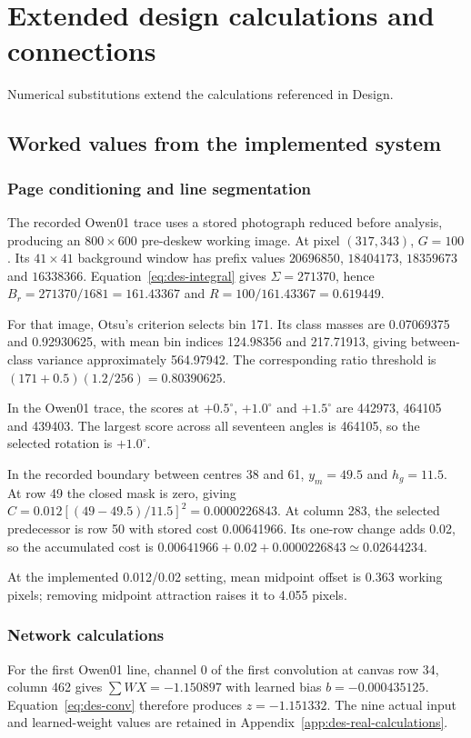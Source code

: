 \section{Extended design calculations and connections}
\label{app:des-implementation}
Numerical substitutions extend the calculations referenced in Design.
\subsection{Worked values from the implemented system}\label{app:worked-design-calculations}

\subsubsection{Page conditioning and line segmentation}
The recorded Owen01 trace uses a stored photograph reduced before analysis, producing an $800\times600$ pre-deskew working image. At pixel $(317,343)$, $G=100$. Its $41\times41$ background window has prefix values $20696850$, $18404173$, $18359673$ and $16338366$. Equation~\ref{eq:des-integral} gives $\Sigma=271370$, hence $B_r=271370/1681=161.43367$ and $R=100/161.43367=0.619449$.

For that image, Otsu's criterion selects bin 171. Its class masses are 0.07069375 and 0.92930625, with mean bin indices 124.98356 and 217.71913, giving between-class variance approximately 564.97942. The corresponding ratio threshold is $(171+0.5)(1.2/256)=0.80390625$.

In the Owen01 trace, the scores at $+0.5^\circ$, $+1.0^\circ$ and $+1.5^\circ$ are 442973, 464105 and 439403. The largest score across all seventeen angles is 464105, so the selected rotation is $+1.0^\circ$.

In the recorded boundary between centres 38 and 61, $y_m=49.5$ and $h_g=11.5$. At row 49 the closed mask is zero, giving $C=0.012[(49-49.5)/11.5]^2=0.0000226843$. At column 283, the selected predecessor is row 50 with stored cost 0.00641966. Its one-row change adds 0.02, so the accumulated cost is $0.00641966+0.02+0.0000226843\simeq0.02644234$.

At the implemented 0.012/0.02 setting, mean midpoint offset is 0.363 working pixels; removing midpoint attraction raises it to 4.055 pixels.


\subsubsection{Network calculations}
For the first Owen01 line, channel 0 of the first convolution at canvas row 34, column 462 gives $\sum WX=-1.150897$ with learned bias $b=-0.000435125$. Equation~\ref{eq:des-conv} therefore produces $z=-1.151332$. The nine actual input and learned-weight values are retained in Appendix~\ref{app:des-real-calculations}.

